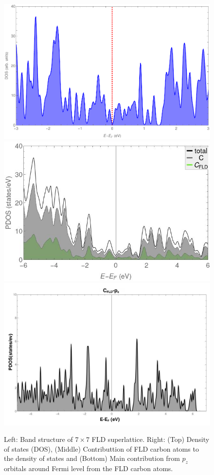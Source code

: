 \documentclass{article}
\begin{document}
\begin{figure}[H]
\begin{minipage}{0.48\textwidth}
    \includegraphics[scale=0.3]{../figures/dos7.pdf} \\[0.5em]
    \includegraphics[scale=0.3]{../figures/pdos_7x7.jpeg} \\[0.5em]
    \includegraphics[scale=0.13]{../figures/CFLD-pz.png}
  \end{minipage}
  \caption{Left: Band structure of $7\times7$ FLD superlattice. Right: (Top) Density of states (DOS), (Middle) Contributtion of FLD carbon atoms to the density of states and (Bottom) Main contribution from $p_z$ orbitals around Fermi level from the FLD carbon atoms.}
  \label{fig:7x7_band}
\end{figure}
\end{document}
